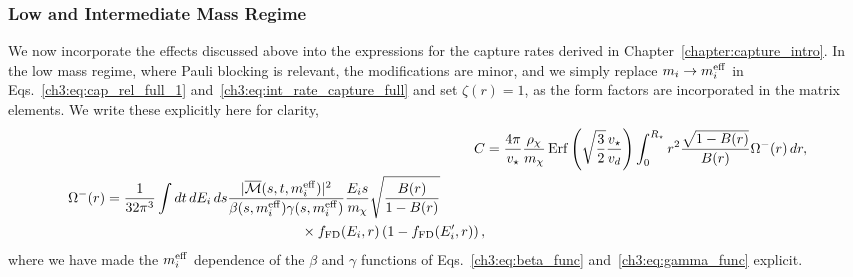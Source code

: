 \subsubsection{Low and Intermediate Mass Regime}
We now incorporate the effects discussed above into the expressions for the capture rates derived in Chapter~\ref{chapter:capture_intro}. In the low mass regime, where Pauli blocking is relevant, the modifications are minor, and we simply replace $m_i\rightarrow m_i^{\rm eff}$ in Eqs.~\ref{ch3:eq:cap_rel_full_1} and~\ref{ch3:eq:int_rate_capture_full} and set $\zeta(r) = 1$, as the form factors are incorporated in the matrix elements. We write these explicitly here for clarity,
% 
\begin{align}
   C & =\frac{4\pi}{v_\star}\frac{\rho_\chi}{m_\chi} \erf\left(\sqrt{\frac{3}{2}}\frac{v_\star}{v_d}\right) \int_0^{R_\star}  r^2\frac{\sqrt{1 - B(r)}}{B(r)}\Omega^-(r)\,dr,
   \label{ch5:eq:cap_general}\\
   \begin{split}
      \Omega^-(r) & = \frac{1}{32\pi^3}\int dt\,d\Ei\,ds \frac{|\overline{\mathcal{M}}(s, t, \mbeff)|^2}{\beta(s, \mbeff)\gamma(s, \mbeff)}\frac{\Ei s}{m_\chi}\sqrt{\frac{B(r)}{1 - B(r)}}\\
      &\hspace{14em} \times \fFD(\Ei, r)\left( 1 - \fFD(\Ei', r)\right),
   \end{split}
   \label{ch5:eq:omega_meff_low}
\end{align}
where we have made the $m_i^{\rm eff}$ dependence of the $\beta$ and $\gamma$ functions of Eqs.~\ref{ch3:eq:beta_func} and~\ref{ch3:eq:gamma_func} explicit. 

